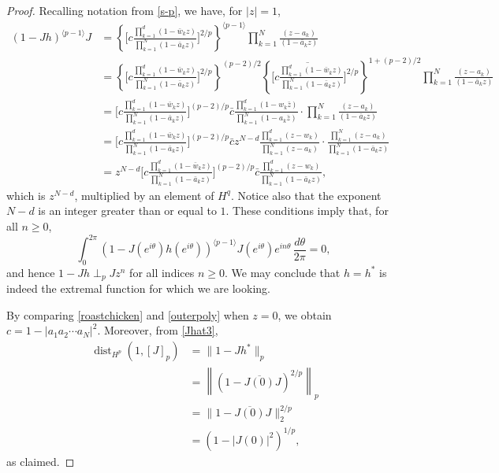 \documentclass[10pt,a4paper]{amsart}
\renewcommand{\geq}{\geqslant}
\begin{document}
\begin{proof}
Recalling notation from \eqref{s-p}, we have, for $|z|=1$,
 \begin{align}
     (1- J h)^{\langle p-1 \rangle}J &=  \left\{ \Bigg[ c\frac{\prod_{k=1}^{d}(1 - \bar{w}_k z)}{\prod_{k=1}^{N}(1 - \bar{a}_k z)}\Bigg]^{2/p}\right\}^{\langle p-1 \rangle} \prod_{k=1}^{N}\frac{(z - a_k) }{ (1-\bar{a}_k z) } \nonumber \\
    &=  \left\{ \Bigg[ c\frac{\prod_{k=1}^{d}(1 - \bar{w}_k z)}{\prod_{k=1}^{N}(1 - \bar{a}_k z)}\Bigg]^{2/p}\right\}^{(p-2)/2} 
     \left\{\overline{ \Bigg[ c\frac{\prod_{k=1}^{d}(1 - \bar{w}_k z)}{\prod_{k=1}^{N}(1 - \bar{a}_k z)} } \Bigg]^{2/p}\right\}^{1+(p-2)/2}
     \prod_{k=1}^{N}\frac{(z - a_k) }{ (1-\bar{a}_k z) } \nonumber \\
     &=   \Bigg[ c\frac{\prod_{k=1}^{d}(1 - \bar{w}_k z)}{\prod_{k=1}^{N}(1 - \bar{a}_k z)}\Bigg]^{(p-2)/p}
      \bar{c}\frac{\prod_{k=1}^{d}(1 - {w}_k \bar{z})}{\prod_{k=1}^{N}(1 - {a}_k \bar{z})}
     \cdot\prod_{k=1}^{N}\frac{(z - a_k) }{ (1-\bar{a}_k z) }   \nonumber\\
     &=   \Bigg[ c\frac{\prod_{k=1}^{d}(1 - \bar{w}_k z)}{\prod_{k=1}^{N}(1 - \bar{a}_k z)}\Bigg]^{(p-2)/p} 
      \bar{c}z^{N-d} \frac{\prod_{k=1}^{d}(z - {w}_k )}{\prod_{k=1}^{N}(z - {a}_k)}
     \cdot\frac{ \prod_{k=1}^{N}(z - a_k) }{ \prod_{k=1}^{N}(1-\bar{a}_k z) } \nonumber \\
     &=  z^{N-d} \Bigg[ c\frac{\prod_{k=1}^{d}(1 - \bar{w}_k z)}{\prod_{k=1}^{N}(1 - \bar{a}_k z)}\Bigg]^{(p-2)/p}
      \bar{c} \frac{\prod_{k=1}^{d}(z - {w}_k )}{ \prod_{k=1}^{N}(1-\bar{a}_k z)}, \label{spicyham}
 \end{align}
 which is $z^{N-d}$, multiplied by an element of $H^q$.  Notice also that the exponent $N-d$ is an integer greater than or equal to $1$.  These conditions imply that, for all $n\geq 0$,
 \[
      \int_{0}^{2\pi} (1- J(e^{i\theta}) h(e^{i\theta}))^{\langle p-1 \rangle}J(e^{i\theta}) e^{in\theta}\,\frac{d\theta}{2\pi} = 0,\ 
 \]
 and hence $1-Jh \perp_p J z^n$ for all indices $n\geq 0$.  We may conclude that $h= h^*$ is indeed the extremal function for which we are looking. 
 
By comparing \eqref{roastchicken} and \eqref{outerpoly} when $z=0$, we obtain $c = 1 - |a_1 a_2 \cdots a_N|^2$.  
Moreover, from \eqref{Jhat3}, 
\begin{align*}
\operatorname{dist}_{H^p} (1, [J]_p) &= \| 1 - J h^*\|_p\\
&= \left\|\left( 1 - \overline{J(0)} J \right)^{2/p}\right\|_p \\
&=  \|  1 - \overline{J(0)} J  \|_2^{2/p} \\
&= \left(1 - |J(0)|^2 \right)^{1/p},
\end{align*}
as claimed. 
\end{proof}
\end{document}
